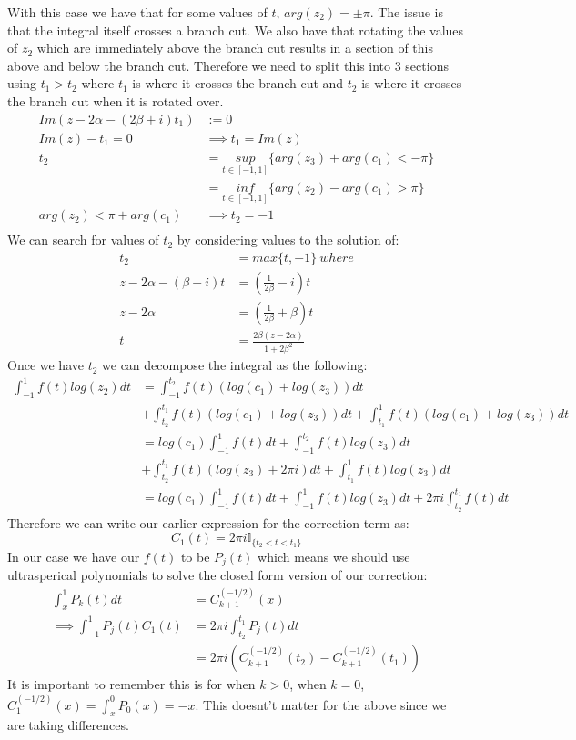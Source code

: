 \documentclass{article}
\begin{document}
With this case we have that for some values of $t$, $arg(z_2)=\pm \pi$.
The issue is that the integral itself crosses a branch cut.
We also have that rotating the values of $z_2$ which are immediately above the branch cut results in a section of this above and below the branch cut.
Therefore we need to split this into 3 sections using $t_1>t_2$ where $t_1$ is where it crosses the branch cut and $t_2$ is where it crosses the branch cut when it is rotated over.
\begin{align}
    Im(z-2\alpha-(2\beta+i)t_1)&:=0\\
    Im(z)-t_1=0 &\implies t_1 = Im(z)\\
    t_2&=\underset{t\in[-1,1]}{sup}\{arg(z_3)+arg(c_1)<-\pi\}\\
    &=\underset{t\in[-1,1]}{inf}\{arg(z_2)-arg(c_1)>\pi\}\\
    arg(z_2)<\pi+arg(c_1) &\implies t_2=-1\\
\end{align}
We can search for values of $t_2$ by considering values to the solution of:
\begin{align}
    t_2&= max\{t,-1\} \: where\\
    z-2\alpha-(\beta+i)t&=(\frac{1}{2\beta}-i)t\\
    z-2\alpha&=(\frac{1}{2\beta}+\beta)t\\
    t&=\frac{2\beta(z-2\alpha)}{1+2\beta^2}
\end{align}
Once we have $t_2$ we can decompose the integral as the following:
\begin{align}
    \int_{-1}^1f(t)log(z_2)dt&=\int_{-1}^{t_2}f(t)(log(c_1)+log(z_3))dt\\
    &+\int_{t_2}^{t_1}f(t)(log(c_1)+log(z_3))dt+\int_{t_1}^1f(t)(log(c_1)+log(z_3))dt\\
    &=log(c_1)\int_{-1}^1f(t)dt+\int_{-1}^{t_2}f(t)log(z_3)dt\\
    &+\int_{t_2}^{t_1}f(t)(log(z_3)+2\pi i)dt+\int_{t_1}^1f(t)log(z_3)dt\\
    &=log(c_1)\int_{-1}^1f(t)dt+\int_{-1}^1f(t)log(z_3)dt+2\pi i\int_{t_2}^{t_1}f(t)dt
\end{align}
Therefore we can write our earlier expression for the correction term as:
$$C_1(t)=2\pi i\mathbb{I}_{\{t_2<t<t_1\}}$$
In our case we have our $f(t)$ to be $P_j(t)$ which means we should use ultrasperical polynomials to solve the closed form version of our correction:
\begin{align}
    \int_x^1P_k(t)dt&=C_{k+1}^{(-1/2)}(x)\\
    \implies \int_{-1}^1P_j(t)C_1(t)&=2\pi i\int_{t_2}^{t_1}P_j(t)dt\\
    &=2\pi i(C_{k+1}^{(-1/2)}(t_2)-C_{k+1}^{(-1/2)}(t_1))
\end{align}
It is important to remember this is for when $k>0$, when $k=0$, $C_1^{(-1/2)}(x)=\int_{x}^0 P_0(x)=-x$.
This doesnt't matter for the above since we are taking differences.
\end{document}
